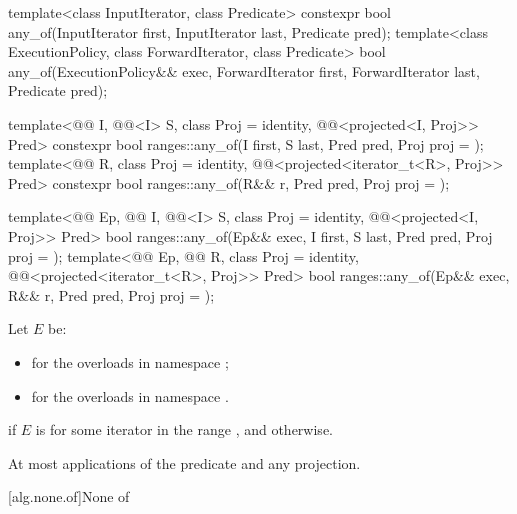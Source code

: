%
\begin{itemdecl}
template<class InputIterator, class Predicate>
  constexpr bool any_of(InputIterator first, InputIterator last, Predicate pred);
template<class ExecutionPolicy, class ForwardIterator, class Predicate>
  bool any_of(ExecutionPolicy&& exec, ForwardIterator first, ForwardIterator last,
              Predicate pred);

template<@@ I, @@<I> S, class Proj = identity,
         @@<projected<I, Proj>> Pred>
  constexpr bool ranges::any_of(I first, S last, Pred pred, Proj proj = {});
template<@@ R, class Proj = identity,
         @@<projected<iterator_t<R>, Proj>> Pred>
  constexpr bool ranges::any_of(R&& r, Pred pred, Proj proj = {});

template<@@ Ep, @@ I, @@<I> S,
         class Proj = identity, @@<projected<I, Proj>> Pred>
  bool ranges::any_of(Ep&& exec, I first, S last, Pred pred, Proj proj = {});
template<@@ Ep, @@ R, class Proj = identity,
         @@<projected<iterator_t<R>, Proj>> Pred>
  bool ranges::any_of(Ep&& exec, R&& r, Pred pred, Proj proj = {});
\end{itemdecl}

\begin{itemdescr}
\pnum
Let $E$ be:
\begin{itemize}
\item
   for the overloads in namespace ;
\item
  for the overloads in namespace .
\end{itemize}

\pnum
\returns
{} if $E$ is  for some iterator 
in the range , and  otherwise.

\pnum
\complexity
At most  applications of the predicate
and any projection.
\end{itemdescr}

[alg.none.of]{None of}

